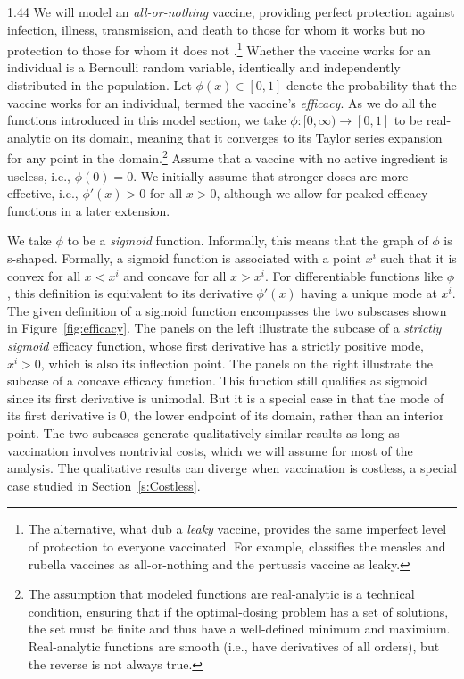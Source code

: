 \documentclass[12pt]{article}
\newcommand{\efficacy}{\phi}
\newcommand{\xpoi}{x^{i}}
\begin{document}
\begin{spacing}{1.44}
We will model an {\em all-or-nothing} vaccine, providing perfect
protection against infection, illness, transmission, and death to
those for whom it works but no protection to those for whom it does
not \citep{Halloran1992}.\footnote{The alternative, what
\citet{Halloran1992} dub a {\em leaky} vaccine, provides the same
imperfect level of protection to everyone vaccinated. For example,
\citet{Farrington2003} classifies the measles and rubella vaccines as
all-or-nothing and the pertussis vaccine as leaky.}  Whether the
vaccine works for an individual is a Bernoulli random variable,
identically and independently distributed in the population. Let
$\efficacy(x) \in [0,1]$ denote the probability that the vaccine works
for an individual, termed the vaccine's {\em efficacy}. As we do all
the functions introduced in this model section, we take $\efficacy:
[0,\infty) \rightarrow [0,1]$ to be real-analytic on its domain,
  meaning that it converges to its Taylor series expansion for any
  point in the domain.\footnote{The assumption that modeled functions
  are real-analytic is a technical condition, ensuring that if the
  optimal-dosing problem has a set of solutions, the set must be
  finite and thus have a well-defined minimum and
  maximium. Real-analytic functions are smooth (i.e., have derivatives
  of all orders), but the reverse is not always true.}  Assume that a
  vaccine with no active ingredient is useless, i.e., $\efficacy(0) =
  0$. We initially assume that stronger doses are more effective,
  i.e., $\efficacy'(x) > 0$ for all $x > 0$, although we allow for
  peaked efficacy functions in a later extension.

We take $\efficacy$ to be a {\em sigmoid} function. Informally, this
means that the graph of $\efficacy$ is s-shaped. Formally, a sigmoid
function is associated with a point $\xpoi$ such that it is convex for
all $x < \xpoi$ and concave for all $x > \xpoi$. For differentiable
functions like $\efficacy$, this definition is equivalent to its
derivative $\efficacy'(x)$ having a unique mode at $\xpoi$.  The given
definition of a sigmoid function encompasses the two subscases shown
in Figure~\ref{fig:efficacy}. The panels on the left illustrate the
subcase of a {\em strictly sigmoid} efficacy function, whose first
derivative has a strictly positive mode, $\xpoi > 0$, which is also
its inflection point. The panels on the right illustrate the subcase
of a concave efficacy function. This function still qualifies as
sigmoid since its first derivative is unimodal. But it is a special
case in that the mode of its first derivative is 0, the lower endpoint
of its domain, rather than an interior point. The two subcases
generate qualitatively similar results as long as vaccination involves
nontrivial costs, which we will assume for most of the analysis. The
qualitative results can diverge when vaccination is costless, a
special case studied in Section~\ref{s:Costless}.


\end{spacing}
\end{document}
